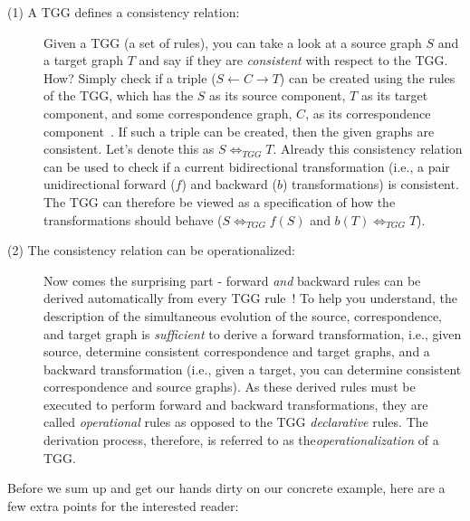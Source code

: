 \begin{description}

\item[(1) A TGG defines a consistency relation:]
	Given a TGG (a set of rules), you can take a look at a source graph $S$ and a target graph $T$ and say if they are \emph{consistent} with
	respect to the TGG. How?  Simply check if a triple ($S\leftarrow C\rightarrow T$) can be created using the rules of the TGG, which has the $S$
	as its source component, $T$ as its target component, and some correspondence graph, $C$, as its correspondence component~\cite{Hermann2011a}. If such a triple
	can be created, then the given graphs are consistent. Let's denote this as $S \Leftrightarrow_{TGG} T$. Already this consistency relation can be used to check
	if a current bidirectional transformation (i.e., a pair unidirectional forward ($f$) and backward ($b$) transformations) is consistent. The TGG can therefore
	be viewed as a specification of how the transformations should behave ($S \Leftrightarrow_{TGG} f(S)$ and $b(T) \Leftrightarrow_{TGG} T$).
	
\item[(2) The consistency relation can be operationalized:]
	Now comes the surprising part - forward \emph{and} backward rules can be derived automatically from every TGG
	rule~\cite{Giese2010,Hermann2011a}! To help you understand, the description of the simultaneous evolution of the source, correspondence, and
	target graph is \emph{sufficient} to derive a forward transformation, i.e., given source, determine consistent correspondence and target graphs, and a
	backward transformation (i.e., given a target, you can determine consistent correspondence and source graphs). As these derived rules must be executed to
	perform forward and backward transformations, they are called \emph{operational} rules as opposed to the TGG \emph{declarative} rules. The derivation process,
	therefore, is referred to as the\emph{operationalization} of a TGG.
	
\end{description}

Before we sum up and get our hands dirty on our concrete example, here are a few extra points for the interested reader:  

